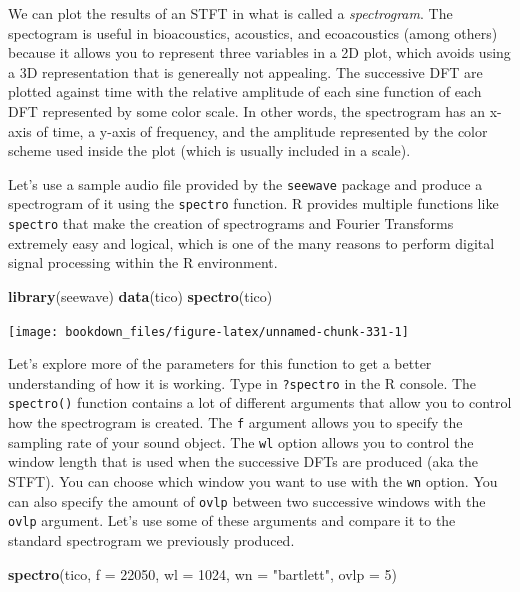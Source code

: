 \documentclass[
]{krantz}
\makeatletter
\newenvironment{Shaded}{\begin{snugshade}}{\end{snugshade}}
\newcommand{\DataTypeTok}[1]{\textcolor[rgb]{0.27,0.27,0.27}{#1}}
\newcommand{\DecValTok}[1]{\textcolor[rgb]{0.06,0.06,0.06}{#1}}
\newcommand{\KeywordTok}[1]{\textcolor[rgb]{0.27,0.27,0.27}{\textbf{#1}}}
\newcommand{\NormalTok}[1]{#1}
\newcommand{\StringTok}[1]{\textcolor[rgb]{0.5,0.5,0.5}{#1}}
\newenvironment{kframe}{%
\medskip{}
\setlength{\fboxsep}{.8em}
 \def\at@end@of@kframe{}%
 \ifinner\ifhmode%
  \def\at@end@of@kframe{\end{minipage}}%
  \begin{minipage}{\columnwidth}%
 \fi\fi%
 \def\FrameCommand##1{\hskip\@totalleftmargin \hskip-\fboxsep
 \colorbox{shadecolor}{##1}\hskip-\fboxsep
     \hskip-\linewidth \hskip-\@totalleftmargin \hskip\columnwidth}%
 \MakeFramed {\advance\hsize-\width
   \@totalleftmargin\z@ \linewidth\hsize
   \@setminipage}}%
 {\par\unskip\endMakeFramed%
 \at@end@of@kframe}
\renewenvironment{Shaded}{\begin{kframe}}{\end{kframe}}
\makeatother
\begin{document}
We can plot the results of an STFT in what is called a \emph{spectrogram}. The spectogram is useful in bioacoustics, acoustics, and ecoacoustics (among others) because it allows you to represent three variables in a 2D plot, which avoids using a 3D representation that is genereally not appealing. The successive DFT are plotted against time with the relative amplitude of each sine function of each DFT represented by some color scale. In other words, the spectrogram has an x-axis of time, a y-axis of frequency, and the amplitude represented by the color scheme used inside the plot (which is usually included in a scale).

Let's use a sample audio file provided by the \texttt{seewave} package and produce a spectrogram of it using the \texttt{spectro} function. R provides multiple functions like \texttt{spectro} that make the creation of spectrograms and Fourier Transforms extremely easy and logical, which is one of the many reasons to perform digital signal processing within the R environment.

\begin{Shaded}
\begin{Highlighting}[]
\KeywordTok{library}\NormalTok{(seewave)}
\KeywordTok{data}\NormalTok{(tico)}
\KeywordTok{spectro}\NormalTok{(tico)}
\end{Highlighting}
\end{Shaded}

\texttt{[image: bookdown\_files/figure-latex/unnamed-chunk-331-1]}

Let's explore more of the parameters for this function to get a better understanding of how it is working. Type in \texttt{?spectro} in the R console. The \texttt{spectro()} function contains a lot of different arguments that allow you to control how the spectrogram is created. The \texttt{f} argument allows you to specify the sampling rate of your sound object. The \texttt{wl} option allows you to control the window length that is used when the successive DFTs are produced (aka the STFT). You can choose which window you want to use with the \texttt{wn} option. You can also specify the amount of \texttt{ovlp} between two successive windows with the \texttt{ovlp} argument. Let's use some of these arguments and compare it to the standard spectrogram we previously produced.

\begin{Shaded}
\begin{Highlighting}[]
\KeywordTok{spectro}\NormalTok{(tico, }\DataTypeTok{f =} \DecValTok{22050}\NormalTok{, }\DataTypeTok{wl =} \DecValTok{1024}\NormalTok{, }\DataTypeTok{wn =} \StringTok{"bartlett"}\NormalTok{, }\DataTypeTok{ovlp =} \DecValTok{5}\NormalTok{)}
\end{Highlighting}
\end{Shaded}
\end{document}
